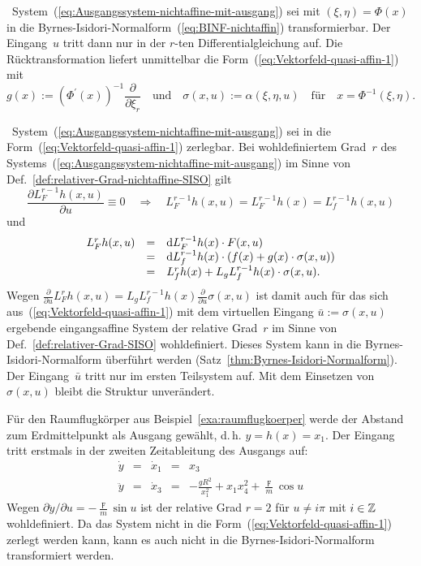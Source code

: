 \begin{svmultproof2}
\hinreichend\ System~(\ref{eq:Ausgangssystem-nichtaffine-mit-ausgang})
sei mit $(\xi,\eta)=\Phi(x)$ in die Byrnes-Isidori-Normal\-form~(\ref{eq:BINF-nichtaffin})
transformierbar. Der Eingang~$u$ tritt dann nur in der $r$-ten
Differentialgleichung auf. Die Rücktransformation liefert unmittelbar
die Form~(\ref{eq:Vektorfeld-quasi-affin-1}) mit 
\[
g(x):=\left(\Phi^{\prime}(x)\right)^{-1}\frac{\partial}{\partial\xi_{r}}\quad\text{und}\quad\sigma(x,u):=\alpha(\xi,\eta,u)\quad\text{für}\quad x=\Phi^{-1}(\xi,\eta).
\]

\notwendig\ System~(\ref{eq:Ausgangssystem-nichtaffine-mit-ausgang})
sei in die Form~(\ref{eq:Vektorfeld-quasi-affin-1}) zerlegbar. Bei
wohldefiniertem Grad~$r$ des Systems~(\ref{eq:Ausgangssystem-nichtaffine-mit-ausgang})
im Sinne von Def.~\ref{def:relativer-Grad-nichtaffine-SISO} gilt
\[
\frac{\partial L_{F}^{r-1}h(x,u)}{\partial u}\equiv0\quad\Rightarrow\quad L_{F}^{r-1}h(x,u)=L_{F}^{r-1}h(x)=L_{f}^{r-1}h(x,u)
\]
und
\[
\begin{array}{lcl}
L_{F}^{r}h(x,u) & = & {\mathrm{d}} L_{F}^{r-1}h(x)\cdot F(x,u)\\
 & = & {\mathrm{d}} L_{f}^{r-1}h(x)\cdot\left(f(x)+g(x)\cdot\sigma(x,u)\right)\\
 & = & L_{f}^{r}h(x)+L_{g}L_{f}^{r-1}h(x)\cdot\sigma(x,u).
\end{array}
\]
Wegen $\tfrac{\partial}{\partial u}L_{F}^{r}h(x,u)=L_{g}L_{f}^{r-1}h(x)\tfrac{\partial}{\partial u}\sigma(x,u)$
ist damit auch für das sich aus~(\ref{eq:Vektorfeld-quasi-affin-1})
mit dem virtuellen Eingang $\bar{u}:=\sigma(x,u)$ ergebende eingangsaffine
System der relative Grad~$r$ im Sinne von Def.~\ref{def:relativer-Grad-SISO}
wohldefiniert. Dieses System kann in die Byrnes-Isidori-Normalform
überführt werden (Satz~\ref{thm:Byrnes-Isidori-Normalform}). Der
Eingang~$\bar{u}$ tritt nur im ersten Teilsystem auf. Mit dem Einsetzen
von $\sigma(x,u)$ bleibt die Struktur unverändert.
\end{svmultproof2}

\begin{example}
\label{exa:raumflugkoerper-byrnes-isidori}Für den Raumflugkörper
aus Beispiel~\ref{exa:raumflugkoerper} werde der Abstand zum Erdmittelpunkt
als Ausgang gewählt, d.\,h. $y=h(x)=x_{1}$. Der Eingang tritt erstmals
in der zweiten Zeitableitung des Ausgangs auf:
\[
\begin{array}{lclcl}
\dot{y} & = & \dot{x}_{1} & = & x_{3}\\
\ddot{y} & = & \dot{x}_{3} & = & -\frac{gR^{2}}{x_{1}^{2}}+x_{1}x_{4}^{2}+\frac{\digamma}{m}\cos u
\end{array}
\]
Wegen $\partial\ddot{y}/\partial u=-\tfrac{\digamma}{m}\sin u$ ist
der relative Grad $r=2$ für $u\neq i\pi$ mit $i\in{\mathbb{Z}}$ wohldefiniert.
Da das System nicht in die Form~(\ref{eq:Vektorfeld-quasi-affin-1})
zerlegt werden kann, kann es auch nicht in die Byrnes-Isidori-Normalform
transformiert werden.
\end{example}

